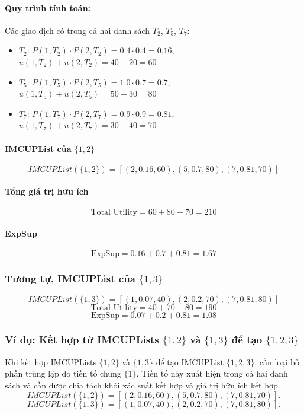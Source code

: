 \documentclass[conference]{IEEEtran}
\begin{document}
\paragraph{Quy trình tính toán:}
Các giao dịch có trong cả hai danh sách \(T_2\), \(T_5\), \(T_7\):
\begin{itemize}
    \item \(T_2\):  
    \(P(1, T_2) \cdot P(2, T_2) = 0.4 \cdot 0.4 = 0.16\),\\  
    \(u(1, T_2) + u(2, T_2) = 40 + 20 = 60\)

    \item \(T_5\):  
    \(P(1, T_5) \cdot P(2, T_5) = 1.0 \cdot 0.7 = 0.7\),\\ 
    \(u(1, T_5) + u(2, T_5) = 50 + 30 = 80\)

    \item \(T_7\):  
    \(P(1, T_7) \cdot P(2, T_7) = 0.9 \cdot 0.9 = 0.81\),\\  
    \(u(1, T_7) + u(2, T_7) = 30 + 40 = 70\)
\end{itemize}

\paragraph{IMCUPList của \(\{1, 2\}\)}
\[
IMCUPList(\{1,2\}) = [(2, 0.16, 60), (5, 0.7, 80), (7, 0.81, 70)]
\]
\paragraph{Tổng giá trị hữu ích}
\[
\text{Total Utility} = 60 + 80 + 70 = 210
\]
\paragraph{ExpSup}
\[
\text{ExpSup} = 0.16 + 0.7 + 0.81 = 1.67
\]

\subsubsection{Tương tự, IMCUPList của \(\{1, 3\}\)}
\[
IMCUPList(\{1,3\}) = [(1, 0.07, 40), (2, 0.2, 70), (7, 0.81, 80)]
\]
\[
\text{Total Utility} = 40 + 70 + 80 = 190
\]
\[
\text{ExpSup} = 0.07 + 0.2 + 0.81 = 1.08
\]

\subsubsection{Ví dụ: Kết hợp từ IMCUPLists \(\{1, 2\}\) và \(\{1, 3\}\) để tạo \(\{1, 2, 3\}\)}
Khi kết hợp IMCUPLists \(\{1, 2\}\) và \(\{1, 3\}\) để tạo IMCUPList \(\{1, 2, 3\}\), cần loại bỏ phần trùng lặp do tiền tố chung \(\{1\}\). Tiền tố này xuất hiện trong cả hai danh sách và cần được chia tách khỏi xác suất kết hợp và giá trị hữu ích kết hợp.
\[
IMCUPList(\{1,2\}) = [(2, 0.16, 60), (5, 0.7, 80), (7, 0.81, 70)].
\]
\[
IMCUPList(\{1,3\}) = [(1, 0.07, 40), (2, 0.2, 70), (7, 0.81, 80)].
\]
\end{document}
